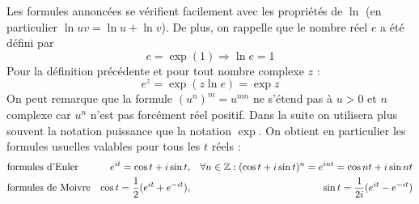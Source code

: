Les formules annoncées se vérifient facilement avec les propriétés de $\ln$ (en particulier $\ln uv = \ln u + \ln v$). De plus, on rappelle que le nombre réel $e$ a été défini par 
\begin{displaymath}
 e = \exp (1) \Rightarrow \ln e =1
\end{displaymath}
Pour la définition précédente et pour tout nombre complexe $z$ :
\begin{displaymath}
 e^z = \exp (z\ln e) = \exp z
\end{displaymath}
On peut remarque que la formule $\left( u^n \right)^m = u^{nm}$ ne s'étend pas à $u>0$ et $n$ complexe car $u^n$ n'est pas forcément réel positif.\newline
Dans la suite on utilisera plus souvent la notation puissance que la notation $\exp$. On obtient en particulier les formules usuelles valables pour tous les $t$ réels :
 
\begin{align*}
 &\text{formules d'Euler} &e^{it} = \cos t + i\sin t &,& \forall n\in \mathbb{Z} : (\cos t + i\sin t)^n = e^{int} =\cos nt + i\sin nt \\
&\text{formules de Moivre} &\cos t = \dfrac{1}{2}(e^{it}+e^{-it}) &,& \sin t = \dfrac{1}{2i}(e^{it}-e^{-it})
\end{align*}

